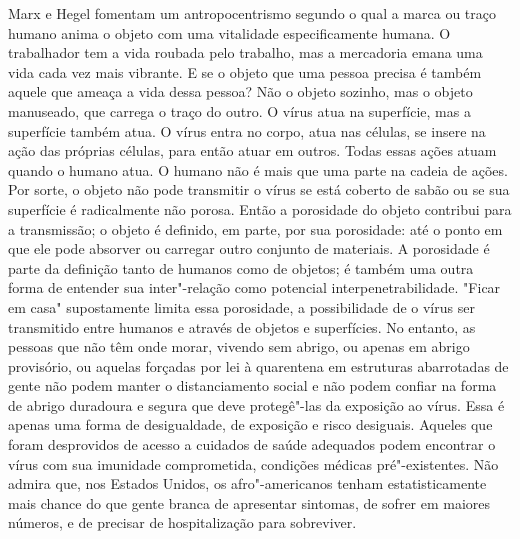 Marx e Hegel fomentam um antropocentrismo segundo o qual a marca ou
traço humano anima o objeto com uma vitalidade especificamente humana. O
trabalhador tem a vida roubada pelo trabalho, mas a mercadoria emana uma
vida cada vez mais vibrante. E se o objeto que uma pessoa precisa é
também aquele que ameaça a vida dessa pessoa? Não o objeto sozinho, mas
o objeto manuseado, que carrega o traço do outro. O vírus atua na
superfície, mas a superfície também atua. O vírus entra no corpo, atua
nas células, se insere na ação das próprias células, para então atuar em
outros. Todas essas ações atuam quando o humano atua. O humano não é
mais que uma parte na cadeia de ações. Por sorte, o objeto não pode
transmitir o vírus se está coberto de sabão ou se sua superfície é
radicalmente não porosa. Então a porosidade do objeto contribui para a
transmissão; o objeto é definido, em parte, por sua porosidade: até o
ponto em que ele pode absorver ou carregar outro conjunto de materiais.
A porosidade é parte da definição tanto de humanos como de objetos; é
também uma outra forma de entender sua inter"-relação como potencial
interpenetrabilidade. "Ficar em casa" supostamente limita essa
porosidade, a possibilidade de o vírus ser transmitido entre humanos e
através de objetos e superfícies. No entanto, as pessoas que não têm
onde morar, vivendo sem abrigo, ou apenas em abrigo provisório, ou
aquelas forçadas por lei à quarentena em estruturas abarrotadas de gente
não podem manter o distanciamento social e não podem confiar na forma de
abrigo duradoura e segura que deve protegê"-las da exposição ao vírus.
Essa é apenas uma forma de desigualdade, de exposição e risco desiguais.
Aqueles que foram desprovidos de acesso a cuidados de saúde adequados
podem encontrar o vírus com sua imunidade comprometida, condições
médicas pré"-existentes. Não admira que, nos Estados Unidos, os
afro"-americanos tenham estatisticamente mais chance do que gente branca
de apresentar sintomas, de sofrer em maiores números, e de precisar de
hospitalização para sobreviver.

